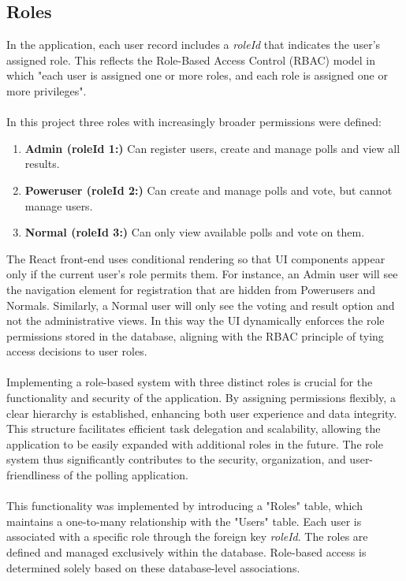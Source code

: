 \documentclass[a4paper,12pt]{report}
\begin{document}
\subsection{Roles}
In the application, each user record includes a \textit{roleId} that indicates the user's assigned role. This reflects the Role-Based Access Control (RBAC) model in which "each user is assigned one or more roles, and each role is assigned one or more privileges". \parencite{rbac}\\\\
In this project three roles with increasingly broader permissions were defined:
\begin{enumerate}
	\item \textbf{Admin (roleId 1:)} Can register users, create and manage polls and view all results.
	\item \textbf{Poweruser (roleId 2:)} Can create and manage polls and vote, but cannot manage users.
	\item \textbf{Normal (roleId 3:)} Can only view available  polls and vote on them.
\end{enumerate}
The React front-end uses conditional rendering so that UI components appear only if the current user's role permits them. For instance, an Admin user will see the navigation element for registration that are hidden from Powerusers and Normals. Similarly, a Normal user will only see the voting and result option and not the administrative views. In this way the UI dynamically enforces the role permissions stored in the database, aligning with the RBAC principle of tying access decisions to user roles. \parencite{rbac}\\\\
Implementing a role-based system with three distinct roles is crucial for the functionality and security of the application. By assigning permissions flexibly, a clear hierarchy is established, enhancing both user experience and data integrity. This structure facilitates efficient task delegation and scalability, allowing the application to be easily expanded with additional roles in the future. The role system thus significantly contributes to the security, organization, and user-friendliness of the polling application.\\\\
This functionality was implemented by introducing a "Roles" table, which maintains a one-to-many relationship with the "Users" table. Each user is associated with a specific role through the foreign key \textit{roleId}. The roles are defined and managed exclusively within the database. Role-based access is determined solely based on these database-level associations.\\\\
\end{document}
